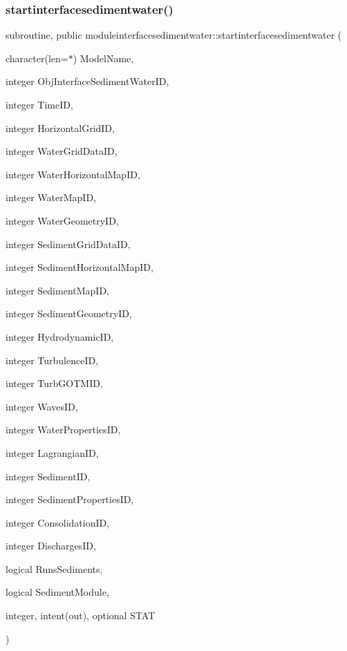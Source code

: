 \subsubsection{\texorpdfstring{startinterfacesedimentwater()}{startinterfacesedimentwater()}}
{\footnotesize\ttfamily subroutine, public moduleinterfacesedimentwater\+::startinterfacesedimentwater (\begin{DoxyParamCaption}\item[{character(len=$\ast$)}]{Model\+Name,  }\item[{integer}]{Obj\+Interface\+Sediment\+Water\+ID,  }\item[{integer}]{Time\+ID,  }\item[{integer}]{Horizontal\+Grid\+ID,  }\item[{integer}]{Water\+Grid\+Data\+ID,  }\item[{integer}]{Water\+Horizontal\+Map\+ID,  }\item[{integer}]{Water\+Map\+ID,  }\item[{integer}]{Water\+Geometry\+ID,  }\item[{integer}]{Sediment\+Grid\+Data\+ID,  }\item[{integer}]{Sediment\+Horizontal\+Map\+ID,  }\item[{integer}]{Sediment\+Map\+ID,  }\item[{integer}]{Sediment\+Geometry\+ID,  }\item[{integer}]{Hydrodynamic\+ID,  }\item[{integer}]{Turbulence\+ID,  }\item[{integer}]{Turb\+G\+O\+T\+M\+ID,  }\item[{integer}]{Waves\+ID,  }\item[{integer}]{Water\+Properties\+ID,  }\item[{integer}]{Lagrangian\+ID,  }\item[{integer}]{Sediment\+ID,  }\item[{integer}]{Sediment\+Properties\+ID,  }\item[{integer}]{Consolidation\+ID,  }\item[{integer}]{Discharges\+ID,  }\item[{logical}]{Runs\+Sediments,  }\item[{logical}]{Sediment\+Module,  }\item[{integer, intent(out), optional}]{S\+T\+AT }\end{DoxyParamCaption})}

